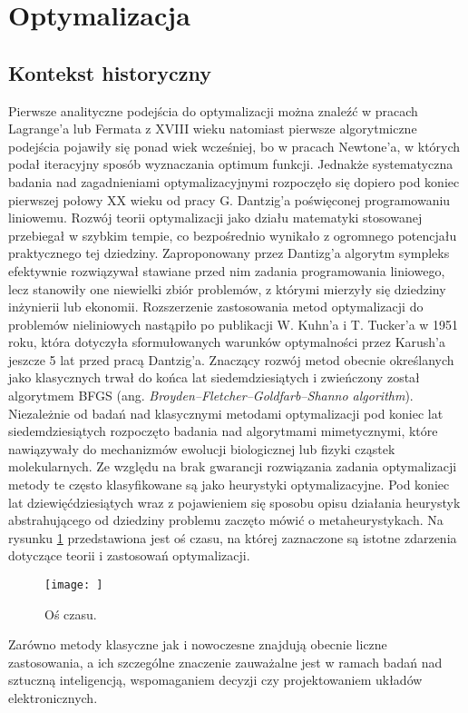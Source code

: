 \newpage
\section{Optymalizacja \label{sec:optim}}
\subsection{Kontekst historyczny \label{subsec:hist}}
    Pierwsze analityczne podejścia do optymalizacji można znaleźć w pracach Lagrange'a lub Fermata z XVIII wieku natomiast pierwsze algorytmiczne podejścia pojawiły się ponad wiek wcześniej, bo w pracach Newtone'a, w których podał iteracyjny sposób wyznaczania optimum funkcji. Jednakże systematyczna badania nad zagadnieniami optymalizacyjnymi rozpoczęło się dopiero pod koniec pierwszej połowy XX wieku od pracy G. Dantzig'a poświęconej programowaniu liniowemu. Rozwój teorii optymalizacji jako działu matematyki stosowanej przebiegał w szybkim tempie, co bezpośrednio wynikało z ogromnego potencjału praktycznego tej dziedziny. Zaproponowany przez Dantizg'a algorytm sympleks efektywnie rozwiązywał stawiane przed nim zadania programowania liniowego, lecz stanowiły one niewielki zbiór problemów, z którymi mierzyły się dziedziny inżynierii lub ekonomii. Rozszerzenie zastosowania metod optymalizacji do problemów nieliniowych nastąpiło po publikacji W. Kuhn'a i T. Tucker'a w 1951 roku, która dotyczyła sformułowanych warunków optymalności przez Karush'a jeszcze 5 lat przed pracą Dantzig'a. Znaczący rozwój metod obecnie określanych jako klasycznych trwał do końca lat siedemdziesiątych i zwieńczony został algorytmem BFGS (ang. \textit{Broyden–Fletcher–Goldfarb–Shanno algorithm}). Niezależnie od badań nad klasycznymi metodami optymalizacji pod koniec lat siedemdziesiątych rozpoczęto badania nad algorytmami mimetycznymi, które nawiązywały do mechanizmów ewolucji biologicznej lub fizyki cząstek molekularnych. Ze względu na brak gwarancji rozwiązania zadania optymalizacji metody te często klasyfikowane są jako heurystyki optymalizacyjne. Pod koniec lat dziewięćdziesiątych wraz z pojawieniem się sposobu opisu działania heurystyk abstrahującego od dziedziny problemu zaczęto mówić o metaheurystykach. Na rysunku \ref{fig:opt-timeline} przedstawiona jest oś czasu, na której zaznaczone są istotne zdarzenia dotyczące teorii i zastosowań optymalizacji.
    \begin{figure}
        \centering
        \texttt{[image: ]}
        \caption{Oś czasu.}
        \label{fig:opt-timeline}
    \end{figure}
    Zarówno metody klasyczne jak i nowoczesne znajdują obecnie liczne zastosowania, a ich szczególne znaczenie zauważalne jest w ramach badań nad sztuczną inteligencją, wspomaganiem decyzji czy projektowaniem układów elektronicznych.
